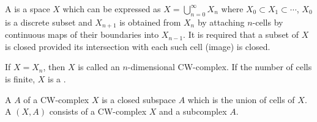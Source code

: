 A  is a space $X$ which can be expressed as $X = \bigcup_{n=0}^{\infty} X_n$ where $X_0 \subset X_1 \subset \cdots$, $X_0$ is a discrete subset and $X_{n+1}$ is obtained from $X_n$ by attaching $n$-cells by continuous maps of their boundaries into $X_{n-1}$. It is required that a subset of $X$ is closed provided its intersection with each such cell (image) is closed.

If $X = X_n$, then $X$ is called an $n$-dimensional CW-complex. If the number of cells is finite, $X$ is a .

A  $A$ of a CW-complex $X$ is a closed subspace $A$ which is the union of cells of $X$. A  $(X, A)$ consists of a CW-complex $X$ and a subcomplex $A$.
